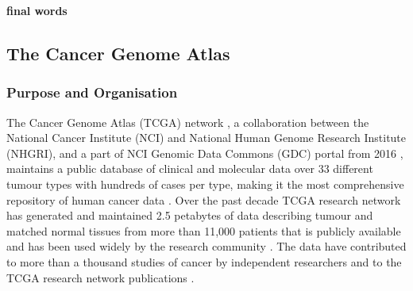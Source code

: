 \textbf{final words}

























    \newpage    
    \subsection{The Cancer Genome Atlas}
    
    
    
    \subsubsection{Purpose and Organisation}

    The Cancer Genome Atlas (TCGA) network \cite{TheTCGA}, a collaboration between the National Cancer Institute (NCI) and National Human Genome Research Institute (NHGRI), and a part of NCI Genomic Data Commons (GDC) portal from 2016 \cite{NCICommons}, maintains a public database of clinical and molecular data over 33 different tumour types with hundreds of cases per type, making it the most comprehensive repository of human cancer data \cite{OverviewTCGA}. Over the past decade TCGA research network has generated and maintained 2.5 petabytes of data describing tumour and matched normal tissues from more than 11,000 patients that is publicly available and has been used widely by the research community \cite{OverviewTCGA}. The data have contributed to more than a thousand studies of cancer by independent researchers and to the TCGA research network publications \cite{Editorial.2015TheGenomics}.


